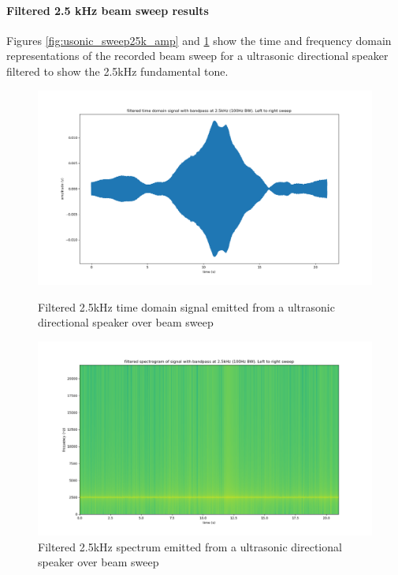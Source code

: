 \paragraph{Filtered 2.5 kHz beam sweep results}
Figures \ref{fig:usonic_sweep25k_amp} and \ref{fig:usonic_sweep25k_spectro} show the time and frequency domain representations of the recorded beam sweep for a ultrasonic directional speaker filtered to show the 2.5kHz fundamental tone. 
\begin{figure}[ht!]
    \centering
    \begin{minipage}{0.49\textwidth}
        \centering
        \includegraphics[width=\textwidth]{Figures/Testing/BeamSweep/Ultrasonic_sqr_am/2_5k_amp_sweep.png}
        \caption{Filtered 2.5kHz time domain signal emitted from a ultrasonic directional speaker over beam sweep}
        \label{fig:usonic_sweep25k_amp}
    \end{minipage}\hfill
    \begin{minipage}{0.49\textwidth}
        \centering
        \includegraphics[width=\textwidth]{Figures/Testing/BeamSweep/Ultrasonic_sqr_am/2_5k_freq_sweep.png}
        \caption{Filtered 2.5kHz spectrum emitted from a ultrasonic directional speaker over beam sweep}
        \label{fig:usonic_sweep25k_spectro}
    \end{minipage}
\end{figure}
